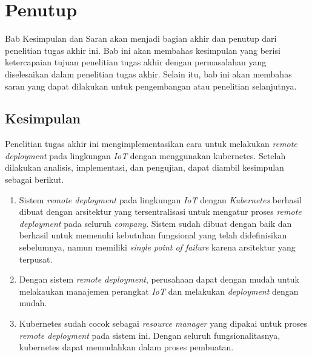 \chapter{Penutup}

Bab Kesimpulan dan Saran akan menjadi bagian akhir dan penutup dari penelitian tugas akhir ini. Bab ini akan membahas kesimpulan yang berisi ketercapaian tujuan penelitian tugas akhir dengan permasalahan yang diselesaikan dalam penelitian tugas akhir. Selain itu, bab ini akan membahas saran yang dapat dilakukan untuk pengembangan atau penelitian selanjutnya.

\section{Kesimpulan}
Penelitian tugas akhir ini mengimplementasikan cara untuk melakukan \textit{remote deployment} pada lingkungan \textit{IoT} dengan menggunakan kubernetes. Setelah dilakukan analisis, implementasi, dan pengujian, dapat diambil kesimpulan sebagai berikut.
\begin{enumerate}
  \item Sistem \textit{remote deployment} pada lingkungan \textit{IoT} dengan \textit{Kubernetes} berhasil dibuat dengan arsitektur yang tersentralisasi untuk mengatur proses \textit{remote deployment} pada seluruh \textit{company}. Sistem sudah dibuat dengan baik dan berhasil untuk memenuhi kebutuhan fungsional yang telah didefinisikan sebelumnya, namun memiliki \textit{single point of failure} karena arsitektur yang terpusat.
  \item Dengan sistem \textit{remote deployment}, perusahaan dapat dengan mudah untuk melakaukan manajemen perangkat \textit{IoT} dan melakukan \textit{deployment} dengan mudah.
  \item Kubernetes sudah cocok sebagai \textit{resource manager} yang dipakai untuk proses \textit{remote deployment} pada sistem ini. Dengan seluruh fungsionalitasnya, kubernetes dapat memudahkan dalam proses pembuatan.
\end{enumerate}

